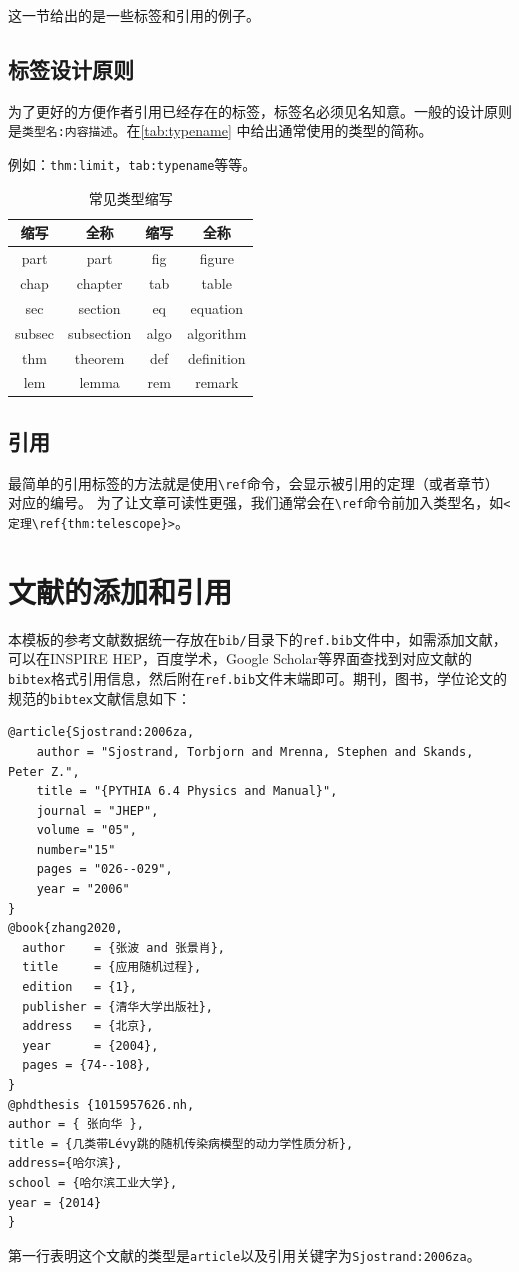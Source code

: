 这一节给出的是一些标签和引用的例子。

\subsection{标签设计原则}

为了更好的方便作者引用已经存在的标签，标签名必须见名知意。一般的设计原则是\verb|类型名:内容描述|。在\autoref{tab:typename} 中给出通常使用的类型的简称。

例如：\verb|thm:limit|，\verb|tab:typename|等等。

\begin{table}[!htp]
	\centering
	\caption{常见类型缩写}
	\begin{tabular}{c|c|c|c}\label{tab:typename}
		缩写 & 全称 & 缩写 & 全称 \\
		\hline
		part & part & fig & figure \\
		chap & chapter & tab & table \\
		sec & section & eq & equation \\
		subsec & subsection & algo & algorithm \\
		thm & theorem & def & definition \\
		lem & lemma & rem & remark \\
	\end{tabular}
\end{table}

\subsection{引用}

最简单的引用标签的方法就是使用\verb|\ref|命令，会显示被引用的定理（或者章节）对应的编号。
为了让文章可读性更强，我们通常会在\verb|\ref|命令前加入类型名，如\verb|<定理\ref{thm:telescope}>|。

\section{文献的添加和引用}

本模板的参考文献数据统一存放在\verb|bib/|目录下的\verb|ref.bib|文件中，如需添加文献，可以在INSPIRE HEP，百度学术，Google Scholar等界面查找到对应文献的\verb|bibtex|格式引用信息，然后附在\verb|ref.bib|文件末端即可。期刊，图书，学位论文的规范的\verb|bibtex|文献信息如下：
\begin{lstlisting}
@article{Sjostrand:2006za,
    author = "Sjostrand, Torbjorn and Mrenna, Stephen and Skands, Peter Z.",
    title = "{PYTHIA 6.4 Physics and Manual}",
    journal = "JHEP",
    volume = "05",
    number="15"
    pages = "026--029",
    year = "2006"
}
@book{zhang2020,
  author    = {张波 and 张景肖},
  title     = {应用随机过程},
  edition   = {1},
  publisher = {清华大学出版社},
  address   = {北京},
  year      = {2004},
  pages = {74--108},
}
@phdthesis {1015957626.nh,
author = { 张向华 },
title = {几类带Lévy跳的随机传染病模型的动力学性质分析},
address={哈尔滨},
school = {哈尔滨工业大学},
year = {2014}
}
\end{lstlisting}
第一行表明这个文献的类型是\verb|article|以及引用关键字为\verb|Sjostrand:2006za|。

